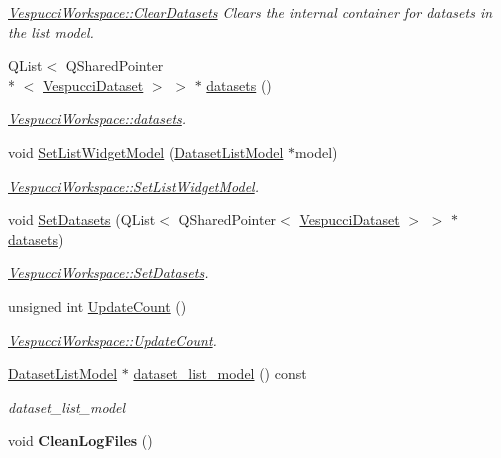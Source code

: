 \begin{DoxyCompactItemize}
\begin{DoxyCompactList}\small\item\em \hyperlink{class_vespucci_workspace_a85053e9aa9e55a70f0a54fed14b8316c}{Vespucci\+Workspace\+::\+Clear\+Datasets} Clears the internal container for datasets in the list model. \end{DoxyCompactList}\item 
Q\+List$<$ Q\+Shared\+Pointer\\*
$<$ \hyperlink{class_vespucci_dataset}{Vespucci\+Dataset} $>$ $>$ $\ast$ \hyperlink{class_vespucci_workspace_a19d833156d34735a35b45b3b9451e06f}{datasets} ()
\begin{DoxyCompactList}\small\item\em \hyperlink{class_vespucci_workspace_a19d833156d34735a35b45b3b9451e06f}{Vespucci\+Workspace\+::datasets}. \end{DoxyCompactList}\item 
void \hyperlink{class_vespucci_workspace_a90fd5d18a50da87f288b4321114d21cb}{Set\+List\+Widget\+Model} (\hyperlink{class_dataset_list_model}{Dataset\+List\+Model} $\ast$model)
\begin{DoxyCompactList}\small\item\em \hyperlink{class_vespucci_workspace_a90fd5d18a50da87f288b4321114d21cb}{Vespucci\+Workspace\+::\+Set\+List\+Widget\+Model}. \end{DoxyCompactList}\item 
void \hyperlink{class_vespucci_workspace_a4c61894b1e3fa46dfa1c413d6744f7a1}{Set\+Datasets} (Q\+List$<$ Q\+Shared\+Pointer$<$ \hyperlink{class_vespucci_dataset}{Vespucci\+Dataset} $>$ $>$ $\ast$\hyperlink{class_vespucci_workspace_a19d833156d34735a35b45b3b9451e06f}{datasets})
\begin{DoxyCompactList}\small\item\em \hyperlink{class_vespucci_workspace_a4c61894b1e3fa46dfa1c413d6744f7a1}{Vespucci\+Workspace\+::\+Set\+Datasets}. \end{DoxyCompactList}\item 
unsigned int \hyperlink{class_vespucci_workspace_aebfe908b3f6d609aa1d9ecb3559b78cb}{Update\+Count} ()
\begin{DoxyCompactList}\small\item\em \hyperlink{class_vespucci_workspace_aebfe908b3f6d609aa1d9ecb3559b78cb}{Vespucci\+Workspace\+::\+Update\+Count}. \end{DoxyCompactList}\item 
\hyperlink{class_dataset_list_model}{Dataset\+List\+Model} $\ast$ \hyperlink{class_vespucci_workspace_ada9cddc306d110d00b13b04799737fa0}{dataset\+\_\+list\+\_\+model} () const 
\begin{DoxyCompactList}\small\item\em dataset\+\_\+list\+\_\+model \end{DoxyCompactList}\item 
\hypertarget{class_vespucci_workspace_ae0dbc24a1eef1ccb70461d4466104e9f}{void {\bfseries Clean\+Log\+Files} ()}\label{class_vespucci_workspace_ae0dbc24a1eef1ccb70461d4466104e9f}

\end{DoxyCompactItemize}


